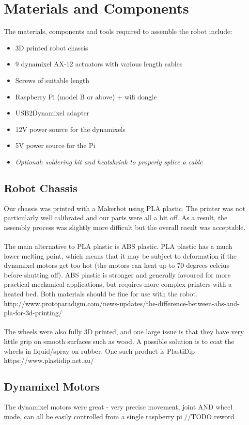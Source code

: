 \documentclass[]{article}
\begin{document}
\section{Materials and Components}
The materials, components and tools required to assemble the robot include:
\begin{itemize}
  \item 3D printed robot chassis
  \item 9 dynamixel AX-12 actuators with various length cables
  \item Screws of suitable length
  \item Raspberry Pi (model B or above) + wifi dongle
  \item USB2Dynamixel adapter
  \item 12V power source for the dynamixels
  \item 5V power source for the Pi
  \item \textit{Optional: soldering kit and heatshrink to properly splice a cable}
\end{itemize}
\subsection{Robot Chassis}
Our chassis was printed with a Makerbot using PLA plastic. The printer was not particularly well calibrated and our parts were all a bit off. As a result, the assembly process was slightly more difficult but the overall result was acceptable.
\\
\\
The main alternative to PLA plastic is ABS plastic. PLA plastic has a much lower melting point, which means that it may be subject to deformation if the dynamixel motors get too hot (the motors can heat up to 70 degrees celcius before shutting off). ABS plastic is stronger and generally favoured for more practical mechanical applications, but requires more complex printers with a heated bed. Both materials should be fine for use with the robot. http://www.protoparadigm.com/news-updates/the-difference-between-abs-and-pla-for-3d-printing/
\\
\\
The wheels were also fully 3D printed, and one large issue is that they have very little grip on smooth surfaces such as wood. A possible solution is to coat the wheels in liquid/spray-on rubber. One such product is PlastiDip https://www.plastidip.net.au/

\subsection{Dynamixel Motors}
The dynamixel motors were great - very precise movement, joint AND wheel mode, can all be easily controlled from a single raspberry pi //TODO reword
\end{document}
